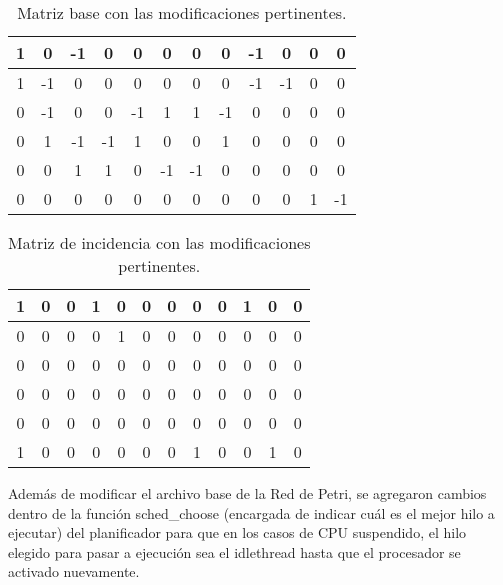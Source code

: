 \begin{table}[H]
    \centering
    \begin{tabular}{|c|c|c|c|c|c|c|c|c|c|c|c|}
        \hline
        1 &  0 & -1 &  0 & 0 & 0 & 0 & 0 & -1 & 0 & 0 & 0 \\
        \hline
        1 & -1 &  0 &  0 & 0 & 0 & 0 & 0 & -1 & -1 & 0 & 0 \\
        \hline
        0 & -1 &  0 &  0 & -1 & 1 & 1 & -1 & 0 & 0 & 0 & 0 \\
        \hline
        0 &  1 & -1 & -1 & 1 & 0 & 0 & 1 & 0 & 0 & 0 & 0 \\
        \hline
        0 &  0 &  1 &  1 & 0 & -1 & -1 & 0 & 0 & 0 & 0 & 0 \\
        \hline
        0 &  0 &  0 &  0 & 0 & 0 & 0 & 0 & 0 & 0 & 1 & -1 \\
        \hline
    \end{tabular}
    \caption{Matriz base con las modificaciones pertinentes.}
    \label{tabla:matriz_base_post_2}
\end{table}

\begin{table}[H]
    \centering
    \begin{tabular}{|c|c|c|c|c|c|c|c|c|c|c|c|}
        \hline
        1 & 0 & 0 & 1 & 0 & 0 & 0 & 0 & 0 & 1 & 0 & 0 \\
        \hline
        0 & 0 & 0 & 0 & 1 & 0 & 0 & 0 & 0 & 0 & 0 & 0 \\
        \hline
        0 & 0 & 0 & 0 & 0 & 0 & 0 & 0 & 0 & 0 & 0 & 0 \\
        \hline
        0 & 0 & 0 & 0 & 0 & 0 & 0 & 0 & 0 & 0 & 0 & 0 \\
        \hline
        0 & 0 & 0 & 0 & 0 & 0 & 0 & 0 & 0 & 0 & 0 & 0 \\
        \hline
        1 & 0 & 0 & 0 & 0 & 0 & 0 & 1 & 0 & 0 & 1 & 0 \\
        \hline
    \end{tabular}
    \caption{Matriz de incidencia con las modificaciones pertinentes.}
    \label{tabla:matriz_incidencia_post_2}
\end{table}

Además de modificar el archivo base de la Red de Petri, se agregaron cambios dentro de la función sched\_choose (encargada de indicar cuál es el mejor hilo a ejecutar) del planificador para que en los casos de CPU suspendido, el hilo elegido para pasar a ejecución sea el idlethread hasta que el procesador se activado nuevamente.\par

